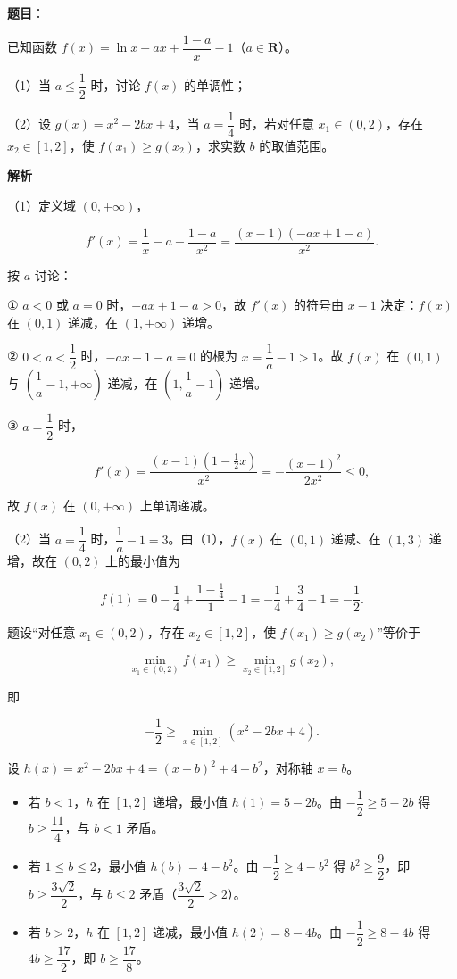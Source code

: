 \begin{answer}

\textbf{题目}：

已知函数 $f(x)=\ln x-ax+\dfrac{1-a}{x}-1$（$a\in\mathbf R$）。

（1）当 $a\leqslant\dfrac12$ 时，讨论 $f(x)$ 的单调性；

（2）设 $g(x)=x^2-2bx+4$，当 $a=\dfrac14$ 时，若对任意 $x_1\in(0,2)$，存在 $x_2\in[1,2]$，使 $f(x_1)\geqslant g(x_2)$，求实数 $b$ 的取值范围。

\textbf{解析}

（1）定义域 $(0,+\infty)$，

\nopagebreak[4]
\[f'(x)=\frac1x-a-\frac{1-a}{x^2}
=\frac{(x-1)(-ax+1-a)}{x^2}.\]

按 $a$ 讨论：

① $a<0$ 或 $a=0$ 时，$-ax+1-a>0$，故 $f'(x)$ 的符号由 $x-1$ 决定：$f(x)$ 在 $(0,1)$ 递减，在 $(1,+\infty)$ 递增。

② $0<a<\dfrac12$ 时，$-ax+1-a=0$ 的根为 $x=\dfrac1a-1>1$。故 $f(x)$ 在 $(0,1)$ 与 $\left(\dfrac1a-1,+\infty\right)$ 递减，在 $\left(1,\dfrac1a-1\right)$ 递增。

③ $a=\dfrac12$ 时，

\nopagebreak[4]
\[f'(x)=\frac{(x-1)\left(1-\frac12x\right)}{x^2}
=-\frac{(x-1)^2}{2x^2}\leqslant0,\]

故 $f(x)$ 在 $(0,+\infty)$ 上单调递减。

（2）当 $a=\dfrac14$ 时，$\dfrac1a-1=3$。由（1），$f(x)$ 在 $(0,1)$ 递减、在 $(1,3)$ 递增，故在 $(0,2)$ 上的最小值为

\nopagebreak[4]
\[f(1)=0-\frac14+\frac{1-\frac14}{1}-1
=-\frac14+\frac34-1=-\frac12.\]

题设“对任意 $x_1\in(0,2)$，存在 $x_2\in[1,2]$，使 $f(x_1)\geqslant g(x_2)$”等价于

\nopagebreak[4]
\[\min_{x_1\in(0,2)}f(x_1)\geqslant\min_{x_2\in[1,2]}g(x_2),\]

即

\nopagebreak[4]
\[-\frac12\geqslant\min_{x\in[1,2]}(x^2-2bx+4).\]

设 $h(x)=x^2-2bx+4=(x-b)^2+4-b^2$，对称轴 $x=b$。

\begin{itemize}
\item 若 $b<1$，$h$ 在 $[1,2]$ 递增，最小值 $h(1)=5-2b$。由 $-\dfrac12\geqslant5-2b$ 得 $b\geqslant\dfrac{11}{4}$，与 $b<1$ 矛盾。
\item 若 $1\leqslant b\leqslant2$，最小值 $h(b)=4-b^2$。由 $-\dfrac12\geqslant4-b^2$ 得 $b^2\geqslant\dfrac92$，即 $b\geqslant\dfrac{3\sqrt2}{2}$，与 $b\leqslant2$ 矛盾（$\dfrac{3\sqrt2}{2}>2$）。
\item 若 $b>2$，$h$ 在 $[1,2]$ 递减，最小值 $h(2)=8-4b$。由 $-\dfrac12\geqslant8-4b$ 得 $4b\geqslant\dfrac{17}{2}$，即 $b\geqslant\dfrac{17}{8}$。
\end{itemize}


\end{answer}
